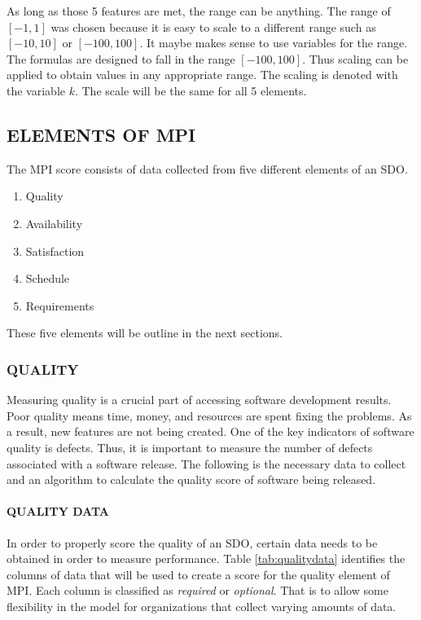 \documentclass[SDSUThesis.tex]{subfiles}
\begin{document}
    As long as those 5 features are met, the range can be anything.  
    The range of $[-1,1]$ was chosen because it is easy to scale 
    to a different range such as $[-10,10]$ or $[-100,100]$.  
    It maybe makes sense to use variables for the range.  
    The formulas are designed to fall in the range $[-100,100]$.  
    Thus scaling can be applied to obtain values in any appropriate range. 
    The scaling is denoted with the variable $k$.  The scale will be the same
    for all 5 elements.
    
    \subsection{ELEMENTS OF MPI}
        The MPI score consists of data collected from five
        different elements of an SDO.  
        \begin{enumerate}
            \item Quality
            \item Availability
            \item Satisfaction
            \item Schedule
            \item Requirements
        \end{enumerate}
        These five elements will be outline in the next sections.
        
        \subsubsection{QUALITY}
            Measuring quality is a crucial part of accessing 
            software development results.  
            Poor quality means time, money, and resources are spent 
            fixing the problems. As a result, new features are not being
            created. One of the key indicators of software quality 
            is defects.  Thus, it is important
            to measure the number of defects associated with a software 
            release.  The following is the necessary data to collect
            and an algorithm to calculate
            the quality score of software being released. 
            
            \paragraph{QUALITY DATA}
                In order to properly score the quality of an SDO,
                certain data needs to be obtained in order to measure
                performance. Table \ref{tab:qualitydata} identifies
                the columns of data that will be used to create
                a score for the quality element of MPI.  
                Each column is classified as \textit{required} or
                \textit{optional}.  That is to allow some flexibility
                in the model for organizations that collect
                varying amounts of data.
                
\end{document}
